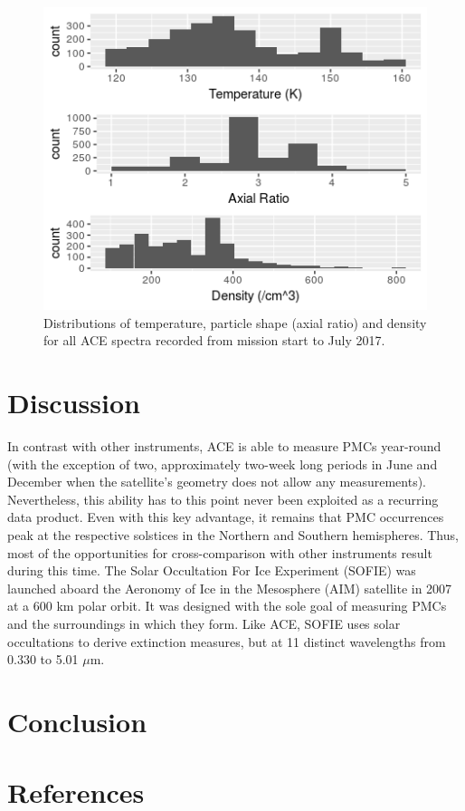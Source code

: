 \documentclass[]{elsarticle}
\begin{document}
\begin{figure}
	\includegraphics{figs/allHistograms}
	\caption{Distributions of temperature, particle shape (axial ratio) and density for all ACE spectra recorded from mission start to July 2017.}
	\label{fig:Fig3}
\end{figure}


\section{Discussion} \label{sec:disc}
In contrast with other instruments, ACE is able to measure PMCs year-round (with the exception of two, approximately two-week long periods in June and December when the satellite's geometry does not allow any measurements). Nevertheless, this ability has to this point never been exploited as a recurring data product. Even with this key advantage, it remains that PMC occurrences peak at the respective solstices in the Northern and Southern hemispheres. Thus, most of the opportunities for cross-comparison with other instruments result during this time. 
The Solar Occultation For Ice Experiment (SOFIE) was launched aboard the Aeronomy of Ice in the Mesosphere (AIM) satellite in 2007 at a 600 km polar orbit. It was designed with the sole goal of measuring PMCs and the surroundings in which they form. Like ACE, SOFIE uses solar occultations to derive extinction measures, but at 11 distinct wavelengths from 0.330 to 5.01 $\mu$m. 

\section{Conclusion} \label{sec:conc}


\section{References}


\end{document}
